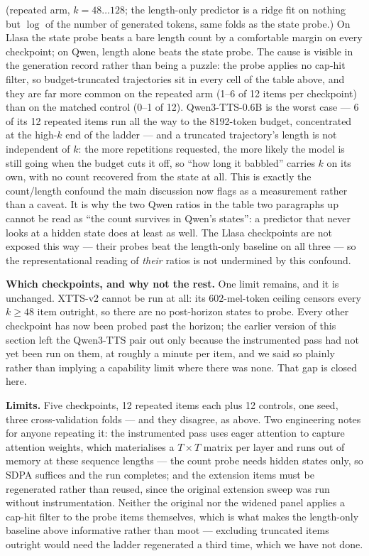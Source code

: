 \documentclass[11pt]{article}
\begin{document}
\noindent(repeated arm, $k=48\ldots128$; the length-only predictor is a ridge fit
on nothing but $\log$ of the number of generated tokens, same folds as the state
probe.) On Llasa the state probe beats a bare length count by a comfortable
margin on every checkpoint; on Qwen, length alone beats the state probe. The
cause is visible in the generation record rather than being a puzzle: the probe
applies no cap-hit filter, so budget-truncated trajectories sit in every cell of
the table above, and they are far more common on the repeated arm (1--6 of 12
items per checkpoint) than on the matched control (0--1 of 12). Qwen3-TTS-0.6B is
the worst case --- 6 of its 12 repeated items run all the way to the 8192-token
budget, concentrated at the high-$k$ end of the ladder --- and a truncated
trajectory's length is not independent of $k$: the more repetitions requested,
the more likely the model is still going when the budget cuts it off, so ``how
long it babbled'' carries $k$ on its own, with no count recovered from the state
at all. This is exactly the count/length confound the main discussion now flags
as a measurement rather than a caveat. It is why the two Qwen ratios in the table
two paragraphs up cannot be read as ``the count survives in Qwen's states'': a
predictor that never looks at a hidden state does at least as well. The Llasa
checkpoints are not exposed this way --- their probes beat the length-only
baseline on all three --- so the representational reading of \emph{their} ratios
is not undermined by this confound.

\noindent\textbf{Which checkpoints, and why not the rest.} One limit remains, and
it is unchanged. XTTS-v2 cannot be run at all: its $602$-mel-token ceiling
censors every $k\ge48$ item outright, so there are no post-horizon states to
probe. Every other checkpoint has now been probed past the horizon; the earlier
version of this section left the Qwen3-TTS pair out only because the instrumented
pass had not yet been run on them, at roughly a minute per item, and we said so
plainly rather than implying a capability limit where there was none. That gap is
closed here.

\noindent\textbf{Limits.} Five checkpoints, 12 repeated items each plus 12
controls, one seed, three cross-validation folds --- and they disagree, as above.
Two engineering notes for anyone repeating it: the instrumented pass uses eager
attention to capture attention weights, which materialises a $T\times T$ matrix
per layer and runs out of memory at these sequence lengths --- the count probe
needs hidden states only, so SDPA suffices and the run completes; and the
extension items must be regenerated rather than reused, since the original
extension sweep was run without instrumentation. Neither the original nor the
widened panel applies a cap-hit filter to the probe items themselves, which is
what makes the length-only baseline above informative rather than moot ---
excluding truncated items outright would need the ladder regenerated a third
time, which we have not done.
\end{document}
